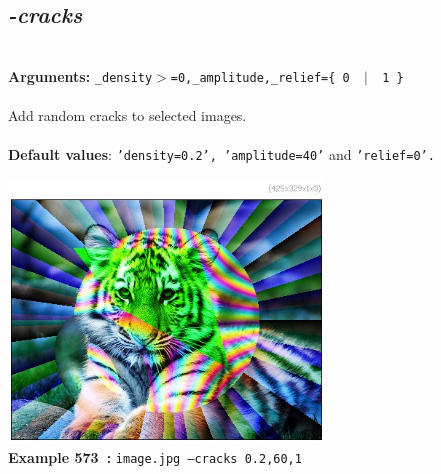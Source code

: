 \documentclass[a4paper,11pt,twoside]{book}
\begin{document}
\subsection{\emph{-cracks} }\vspace*{-0.5em}
~\\\textbf{Arguments: } 
{\small \texttt{\_density$>$=0,\_amplitude,\_relief=\{ 0 ~$|$~ 1 \}}}\\~\\
Add random cracks to selected images.
~\\~\\\textbf{Default values}: {\small \texttt{'density=0.2', 'amplitude=40'} and \texttt{'relief=0'.}}
\begin{center}\includegraphics[keepaspectratio=true,height=7cm,width=\textwidth]{img/gmic_def573.jpg}\\
{\footnotesize \textbf{Example 573~:} \texttt{image.jpg --cracks 0.2,60,1}}
\end{center}
\end{document}
